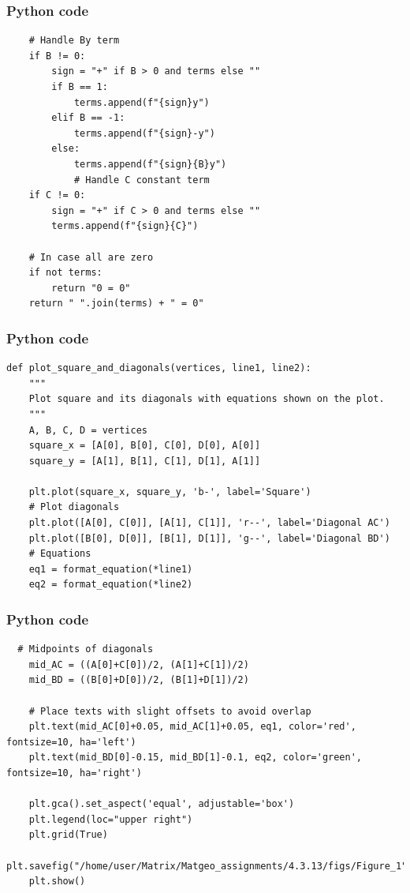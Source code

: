 \documentclass{beamer}
\begin{document}
\begin{frame}[fragile]
    \frametitle{Python code}

    \begin{lstlisting}
    # Handle By term
    if B != 0:
        sign = "+" if B > 0 and terms else ""
        if B == 1:
            terms.append(f"{sign}y")
        elif B == -1:
            terms.append(f"{sign}-y")
        else:
            terms.append(f"{sign}{B}y")
            # Handle C constant term
    if C != 0:
        sign = "+" if C > 0 and terms else ""
        terms.append(f"{sign}{C}")

    # In case all are zero
    if not terms:
        return "0 = 0"
    return " ".join(terms) + " = 0"
    \end{lstlisting}
\end{frame}


\begin{frame}[fragile]
    \frametitle{Python code}

    \begin{lstlisting}
def plot_square_and_diagonals(vertices, line1, line2):
    """
    Plot square and its diagonals with equations shown on the plot.
    """
    A, B, C, D = vertices
    square_x = [A[0], B[0], C[0], D[0], A[0]]
    square_y = [A[1], B[1], C[1], D[1], A[1]]
    
    plt.plot(square_x, square_y, 'b-', label='Square') 
    # Plot diagonals
    plt.plot([A[0], C[0]], [A[1], C[1]], 'r--', label='Diagonal AC')
    plt.plot([B[0], D[0]], [B[1], D[1]], 'g--', label='Diagonal BD')
    # Equations
    eq1 = format_equation(*line1)
    eq2 = format_equation(*line2)
    \end{lstlisting}
\end{frame}

\begin{frame}[fragile]
    \frametitle{Python code}

    \begin{lstlisting}
  # Midpoints of diagonals
    mid_AC = ((A[0]+C[0])/2, (A[1]+C[1])/2)
    mid_BD = ((B[0]+D[0])/2, (B[1]+D[1])/2)
    
    # Place texts with slight offsets to avoid overlap
    plt.text(mid_AC[0]+0.05, mid_AC[1]+0.05, eq1, color='red', fontsize=10, ha='left')
    plt.text(mid_BD[0]-0.15, mid_BD[1]-0.1, eq2, color='green', fontsize=10, ha='right')
    
    plt.gca().set_aspect('equal', adjustable='box')
    plt.legend(loc="upper right")
    plt.grid(True)
    plt.savefig("/home/user/Matrix/Matgeo_assignments/4.3.13/figs/Figure_1")
    plt.show()
    \end{lstlisting}
\end{frame}
\end{document}
